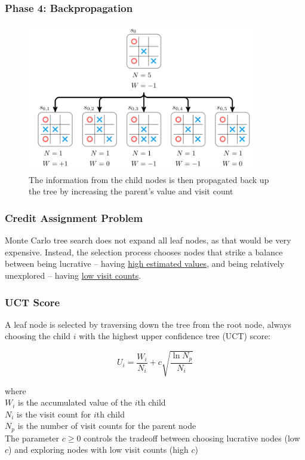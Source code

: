 \documentclass[notheorems, aspectratio=54]{beamer}
\begin{document}
\begin{frame}
    \frametitle{Phase 4: Backpropagation}

    \begin{figure}
        \includegraphics[width=0.9\textwidth]{fig/mcts_backpropagation.png}
        \caption{The information from the child nodes is then propagated back up the tree by increasing the parent's value and visit count}
    \end{figure}
\end{frame}

\begin{frame}
    \frametitle{Credit Assignment Problem} %
    Monte Carlo tree search does not expand all leaf nodes, as that would be very expensive. Instead, the selection process chooses nodes that strike a balance between being lucrative -- having \underline{high estimated values}, and being relatively unexplored -- having \underline{low visit counts}.
\end{frame}


\begin{frame}
    \frametitle{UCT Score}

    A leaf node is selected by traversing down the tree from the root node, always choosing the child $i$ with the highest upper confidence tree (UCT) score:

    $$
    U_i = \frac{W_i}{N_i} + c\sqrt{\frac{\ln N_p}{N_i}}
    $$

    where \\
    \hspace{1em} $W_i$ is the accumulated value of the $i$th child \\
    \hspace{1em} $N_i$ is the visit count for $i$th child \\
    \hspace{1em} $N_p$ is the number of visit counts for the parent node \\
    \hspace{1em} The parameter $c \ge 0$ controls the tradeoff between choosing lucrative nodes (low $c$) and exploring nodes with low visit counts (high $c$)
\end{frame}
\end{document}
